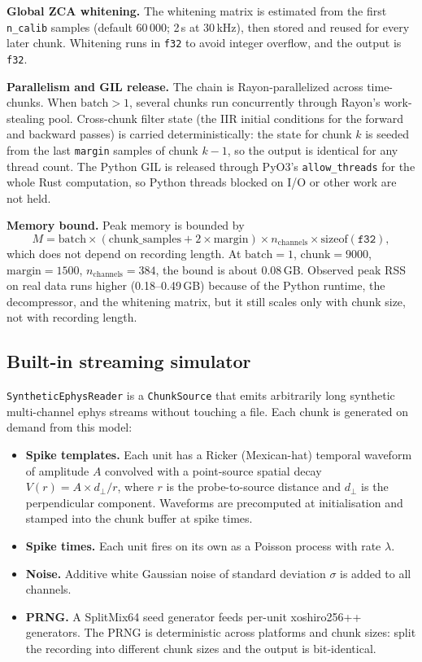 \documentclass[11pt]{article}
\begin{document}
\textbf{Global ZCA whitening.} The whitening matrix is estimated from the first \texttt{n\_calib}
samples (default 60\,000; 2\,s at 30\,kHz), then stored and reused for every later chunk. Whitening
runs in \texttt{f32} to avoid integer overflow, and the output is \texttt{f32}.

\textbf{Parallelism and GIL release.} The chain is Rayon-parallelized across time-chunks. When
$\text{batch} > 1$, several chunks run concurrently through Rayon's work-stealing pool. Cross-chunk
filter state (the IIR initial conditions for the forward and backward passes) is carried
deterministically: the state for chunk $k$ is seeded from the last \texttt{margin} samples of chunk
$k-1$, so the output is identical for any thread count. The Python GIL is released through PyO3's
\texttt{allow\_threads} for the whole Rust computation, so Python threads blocked on I/O or other work
are not held.

\textbf{Memory bound.} Peak memory is bounded by
\[
M = \text{batch} \times (\text{chunk\_samples} + 2 \times \text{margin}) \times n_{\text{channels}}
\times \text{sizeof}(\texttt{f32}),
\]
which does not depend on recording length. At $\text{batch} = 1$, $\text{chunk} = 9000$,
$\text{margin} = 1500$, $n_{\text{channels}} = 384$, the bound is about 0.08\,GB. Observed peak RSS on
real data runs higher (0.18--0.49\,GB) because of the Python runtime, the decompressor, and the
whitening matrix, but it still scales only with chunk size, not with recording length.

\subsection{Built-in streaming simulator}

\texttt{SyntheticEphysReader} is a \texttt{ChunkSource} that emits arbitrarily long synthetic
multi-channel ephys streams without touching a file. Each chunk is generated on demand from this
model:

\begin{itemize}
  \item \textbf{Spike templates.} Each unit has a Ricker (Mexican-hat) temporal waveform of amplitude
  $A$ convolved with a point-source spatial decay $V(r) = A \times d_{\perp} / r$, where $r$ is the
  probe-to-source distance and $d_{\perp}$ is the perpendicular component. Waveforms are precomputed at
  initialisation and stamped into the chunk buffer at spike times.
  \item \textbf{Spike times.} Each unit fires on its own as a Poisson process with rate $\lambda$.
  \item \textbf{Noise.} Additive white Gaussian noise of standard deviation $\sigma$ is added to all
  channels.
  \item \textbf{PRNG.} A SplitMix64 seed generator feeds per-unit xoshiro256++ generators. The PRNG is
  deterministic across platforms and chunk sizes: split the recording into different chunk sizes and
  the output is bit-identical.
\end{itemize}
\end{document}
